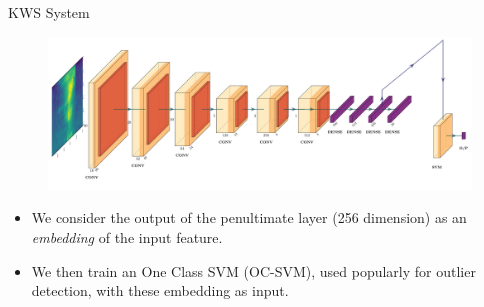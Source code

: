 \documentclass{beamer}
\begin{document}
\begin{frame}{KWS System}
	\begin{figure}[h]
		\centering
		\includegraphics[width=1\linewidth, height=0.35\linewidth]{../results/kws3.jpg}
		\label{fig:feature_embedder}
	\end{figure}

	\begin{itemize}
		\item<1-> We consider the output of the penultimate layer (256 dimension) as an \textit{embedding} of the input feature.
		\item<2-> We then train an One Class SVM (OC-SVM), used popularly for outlier detection, with these embedding as input.
	\end{itemize}
\end{frame}
\end{document}
